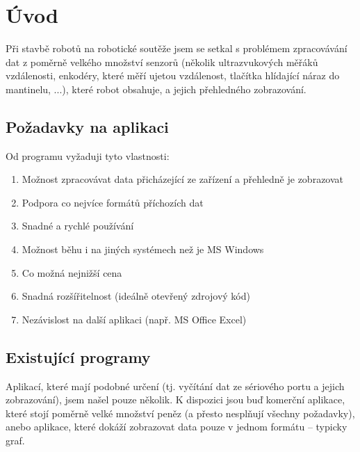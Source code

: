 \documentclass[12pt, a4paper, oneside]{article}
\begin{document}
\tableofcontents  %

\addtolength{\textheight}{-30mm} %
\newpage
\setlength{\voffset}{0mm} %
\pagestyle{plain}
\section*{Úvod}

Při stavbě robotů na robotické soutěže jsem se setkal s problémem zpracovávání dat z poměrně velkého množství senzorů (několik ultrazvukových měřáků vzdálenosti, enkodéry, které měří ujetou vzdálenost, tlačítka hlídající náraz do mantinelu, ...), které robot obsahuje, a jejich přehledného zobrazování. 
\subsection*{Požadavky na aplikaci}
Od programu vyžaduji tyto vlastnosti:
\begin{enumerate}
    \item Možnost zpracovávat data přicházející ze zařízení a přehledně je zobrazovat %
    \item Podpora co nejvíce formátů příchozích dat %
    \item Snadné a rychlé používání %
    \item Možnost běhu i na jiných systémech než je MS Windows %
    \item Co možná nejnižší cena %
    \item Snadná rozšířitelnost (ideálně otevřený zdrojový kód) %
    \item Nezávislost na další aplikaci (např. MS Office Excel) %
\end{enumerate}


\subsection*{Existující programy}
Aplikací, které mají podobné určení (tj. vyčítání dat ze sériového portu a jejich zobrazování), jsem našel pouze několik. K dispozici jsou buď komerční aplikace, které stojí poměrně velké množství peněz (a přesto nesplňují všechny požadavky), anebo aplikace, které dokáží zobrazovat data pouze v jednom formátu -- typicky graf.
\end{document}
